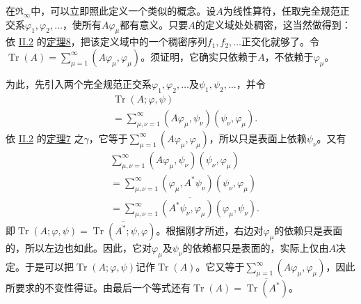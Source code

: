 \documentclass[fontsize=13pt,twoside,openany,headings=normal,parskip=false,bookmarkpackage=false,DIV=calc]{scrbook}
\begin{document}
在$\mathfrak R_\infty$中，可以立即照此定义一个类似的概念。设$A$为线性算符，任取完全规范正交系$\varphi_1,\allowbreak \varphi_2,\allowbreak \ldots$，使所有$A\varphi_\mu$都有意义。只要$A$的定义域处处稠密，这当然做得到：依 \hyperref[sec:II.2]{II.2} 的\CJKglue \hyperref[thm:II.8]{定理8}，把该定义域中的一个稠密序列$f_1,\allowbreak f_2,\allowbreak \ldots$正交化就够了。令$\operatorname{Tr}(A)=\sum_{\mu=1}^\infty(A\varphi_\mu,\allowbreak \varphi_\mu)$。须证明，它确实只依赖于$A$，不依赖于$\varphi_\mu$。

\hypertarget{origpage-94}{}\label{origpage-94}为此，先引入两个完全规范正交系$\varphi_1,\allowbreak \varphi_2,\allowbreak \ldots$及$\psi_1,\allowbreak \psi_2,\allowbreak \ldots$，并令
\begin{align*}
&\operatorname{Tr}(A;\varphi,\psi)\\
&=\sum_{\mu,\nu=1}^\infty(A\varphi_\mu,\psi_\nu)(\psi_\nu,\varphi_\mu).
\end{align*}
依 \hyperref[sec:II.2]{II.2} 的\CJKglue \hyperref[thm:II.7]{定理7} 之$\gamma$，它等于$\sum_{\mu=1}^\infty(A\varphi_\mu,\allowbreak \varphi_\mu)$，所以只是表面上依赖$\psi_\nu$。又有
\begin{align*}
&\sum_{\mu,\nu=1}^\infty(A\varphi_\mu,\psi_\nu)(\psi_\nu,\varphi_\mu)\\
&=\sum_{\mu,\nu=1}^\infty(\varphi_\mu,A^*\psi_\nu)(\psi_\nu,\varphi_\mu)\\
&=\overline{\sum_{\mu,\nu=1}^\infty(A^*\psi_\nu,\varphi_\mu)(\varphi_\mu,\psi_\nu)}.
\end{align*}
即$\operatorname{Tr}(A;\varphi,\allowbreak \psi)=\overline{\operatorname{Tr}(A^*;\psi,\allowbreak \varphi)}$。根据刚才所述，右边对$\varphi_\mu$的依赖只是表面的，所以左边也如此。因此，它对$\varphi_\mu$及$\psi_\nu$的依赖都只是表面的，实际上仅由$A$决定。于是可以把$\operatorname{Tr}(A;\varphi,\allowbreak \psi)$记作$\operatorname{Tr}(A)$。它又等于$\sum_{\mu=1}^\infty(A\varphi_\mu,\allowbreak \varphi_\mu)$，因此所要求的不变性得证。由最后一个等式还有$\operatorname{Tr}(A)=\overline{\operatorname{Tr}(A^*)}$。
\end{document}
